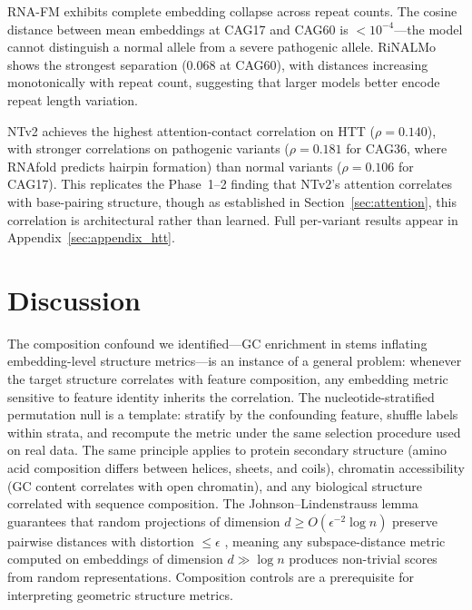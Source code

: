 \documentclass[11pt]{article}
\begin{document}
RNA-FM exhibits complete embedding collapse across repeat counts.
The cosine distance between mean embeddings at CAG17 and CAG60 is
$< 10^{-4}$---the model cannot distinguish a normal allele from a
severe pathogenic allele.  RiNALMo shows the strongest separation
(0.068 at CAG60), with distances increasing monotonically with
repeat count, suggesting that larger models better encode repeat
length variation.

NTv2 achieves the highest attention-contact correlation on HTT
($\rho = 0.140$), with stronger correlations on pathogenic variants
($\rho = 0.181$ for CAG36, where RNAfold predicts hairpin formation)
than normal variants ($\rho = 0.106$ for CAG17).  This replicates
the Phase~1--2 finding that NTv2's attention correlates with
base-pairing structure, though as established in Section~\ref{sec:attention},
this correlation is architectural rather than learned.
Full per-variant results appear in Appendix~\ref{sec:appendix_htt}.


\section{Discussion}
\label{sec:discussion}

The composition confound we identified---GC enrichment in stems
inflating embedding-level structure metrics---is an instance of a
general problem: whenever the target structure correlates with feature
composition, any embedding metric sensitive to feature identity
inherits the correlation.  The nucleotide-stratified permutation null
is a template: stratify by the confounding feature, shuffle labels
within strata, and recompute the metric under the same selection
procedure used on real data.  The same principle applies to protein
secondary structure (amino acid composition differs between helices,
sheets, and coils), chromatin accessibility (GC content correlates
with open chromatin), and any biological structure correlated with
sequence composition.  The Johnson--Lindenstrauss lemma guarantees
that random projections of dimension $d \geq O(\epsilon^{-2} \log n)$
preserve pairwise distances with distortion $\leq \epsilon$
\citep{johnson1984extensions}, meaning any subspace-distance metric
computed on embeddings of dimension $d \gg \log n$ produces
non-trivial scores from random representations.  Composition controls
are a prerequisite for interpreting geometric structure metrics.
\end{document}
